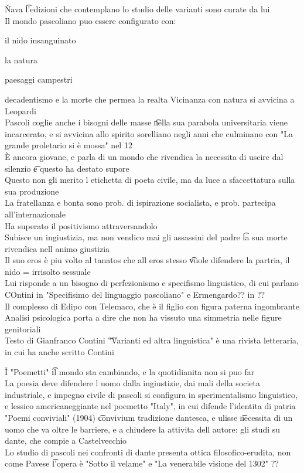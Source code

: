 \documentclass[12pt]{article}
\begin{document}
\v

Nava \t l'edizioni che contemplano lo studio delle varianti sono curate da lui \\
Il mondo pascoliano puo essere configurato con:
\bi
    \item il nido insanguinato
    \item la natura
    \item paesaggi campestri
    \item decadentismo e la morte che permea la realta
\ei
Vicinanza con natura si avvicina a Leopardi \\
Pascoli coglie anche i bisogni delle masse \t nella sua parabola universitaria viene incarcerato, e si avvicina allo spirito sorelliano negli anni che culminano con "La grande proletario si è mossa" nel 12 \\
È ancora giovane, e parla di un mondo che rivendica la necessita di uscire dal silenzio \t e questo ha destato supore \\
Questo non gli merito l etichetta di poeta civile, ma da luce a sfaccettatura sulla sua produzione \\
La fratellanza e bonta sono prob. di ispirazione socialista, e prob. partecipa all'internazionale \\
Ha superato il positivismo attraversandolo \\
Subisce un ingiustizia, ma non vendico mai gli assassini del padre \t la sua morte rivendica nell animo giustizia \\
Il suo eros è piu volto al tanatos che all eros stesso \t vuole difendere la partria, il nido = irrisolto sessuale \\
Lui risponde a un bisogno di perfezionismo e specifismo linguistico, di cui parlano COntini in "Specifisimo del linguaggio pascoliano" e Ermengardo?? in ?? \\
Il complesso di Edipo con Telemaco, che è il figlio con figura paterna ingombrante \\
Analisi psicologica porta a dire che non ha vissuto una simmetria nelle figure genitoriali \\
Testo di Gianfranco Contini \t "Varianti ed altra linguistica" è una rivista letteraria, in cui ha anche scritto Contini

\v

I "Poemetti" \t il mondo sta cambiando, e la quotidianita non si puo far \\
La poesia deve difendere l uomo dalla ingiustizie, dai mali della societa industriale, e impegno civile di pascoli si configura in sperimentalismo linguistico, e lessico americaneggiante nel poemetto "Italy", in cui difende l'identita di patria \\
"Poemi conviviali" (1904) \t convivium tradizione dantesca, e ulisse \t necessita di un uomo che va oltre le barriere, e a chiudere la attivita dell autore: gli studi su dante, che compie a Castelvecchio \\
Lo studio di pascoli nei confronti di dante presenta ottica filosofico-erudita, non come Pavese \t l'opera è "Sotto il velame" e "La venerabile visione del 1302" ??
\end{document}
